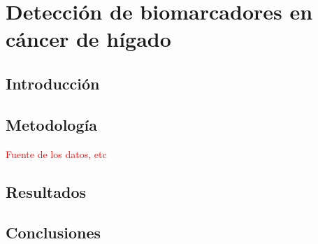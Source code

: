 \chapter{Detección de biomarcadores en cáncer de hígado}

\section{Introducción}

\section{Metodología}

\textcolor{red}{Fuente de los datos, etc}

\section{Resultados}


\section{Conclusiones}

